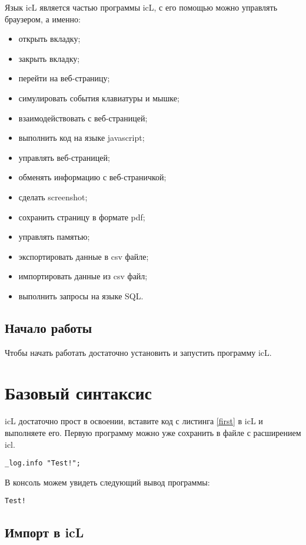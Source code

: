 \documentclass[a4paper, 14pt]{extarticle}
\newenvironment{icItems}
	{ \begin{itemize} [noitemsep,nolistsep] }
	{ \end{itemize} }
\begin{document}
	Язык icL является частью программы icL, с его помощью
	можно управлять браузером, а именно:
	\begin{icItems}
	\item открыть вкладку;
	\item закрыть вкладку;
	\item перейти на веб-страницу;
	\item симулировать события клавиатуры и мышке;
	\item взаимодействовать с веб-страницей;
	\item выполнить код на языке javascript;
	\item управлять веб-страницей;
	\item обменять информацию с веб-страничкой;
	\item сделать screenshot;
	\item сохранить страницу в формате pdf;
	\item управлять памятью;
	\item экспортировать данные в csv файле;
	\item импортировать данные из csv файл;
	\item выполнить запросы на языке SQL.
	\end{icItems}
	
	\subsection{Начало работы}
	
	Чтобы начать работать достаточно установить и запустить программу icL.
	
	\newpage
	\section{Базовый синтаксис}
	
	icL достаточно прост в освоении, вставите код с листинга \ref{first} в icL и выполняете его. Первую программу можно уже сохранить в файле с расширением icl.
	
	\begin{lstlisting}[caption=Первая программа,
						   label=first]
_log.info "Test!";
	\end{lstlisting}
	
	В консоль можем увидеть следующий вывод программы:
	
	\begin{lstlisting}[numbers=none]
Test!
	\end{lstlisting}
	
	\subsection{Импорт в icL}
	
\end{document}
